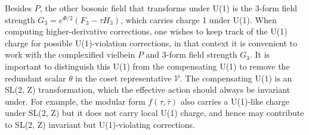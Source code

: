 Besides $P$, the other bosonic field that transforms under U(1) is the 3-form field strength $G_3 = e^{\Phi/2}(F_3 - \tau H_3)$, which carries charge 1 under U(1).
When computing higher-derivative corrections, one wishes to keep track of the U(1) charge for possible U(1)-violation corrections, in that context it is convenient to work with the complexified vielbein $P$ and 3-form field strength $G_3$.
It is important to distinguish this U(1) from the compensating U(1) to remove the redundant scalar $\theta$ in the coset representative $\mathcal{V}$. The compensating U(1) is an SL(2, Z) transformation, which the effective action should always be invariant under. For example, the modular form $f(\tau, \bar\tau)$ also carries a U(1)-like charge under SL(2, Z) but it does not carry local U(1) charge, and hence may contribute to SL(2, Z) invariant but U(1)-violating corrections.